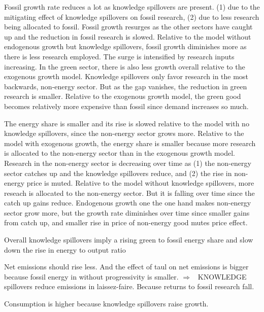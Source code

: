 \documentclass[12pt]{article}
\newcommand{\ar}{$\Rightarrow$ \ }
\begin{document}
Fossil growth rate reduces a lot as knowledge spillovers are present. (1) due to the mitigating effect of knowledge spillovers on fossil research, (2) due to less research being allocated to fossil. Fossil growth resurges as the other sectors have caught up and the reduction in fossil research is slowed. Relative to the model without endogenous growth but knowledge spillovers, fossil growth diminishes more as there is less research employed. The surge is intensified by research inputs increasing. 
In the green sector, there is also less growth overall relative to the exogenous growth model. Knowledge spillovers only favor research in the most backwards, non-energy sector. But as the gap vanishes, the reduction in green research is smaller. Relative to the exogenous growth model, the green good becomes relatively more expensive than fossil since demand increases so much. 


The energy share is smaller and its rise is slowed relative to the model with no knowledge spillovers, since the non-energy sector grows more. Relative to the model with exogenous growth, the energy share is smaller because more research is allocated to the non-energy sector than in the exogenous growth model. Research in the non-energy sector is decreasing over time as (1) the non-energy sector catches up and the knowledge spillovers reduce, and (2) the rise in non-energy price is muted. Relative to the model without knowledge spillovers, more reseach is allocated to the non-energy sector. But it is falling over time since the catch up gains reduce. 
Endogenous growth one the one hand makes non-energy sector grow more, but the growth rate diminishes over time since smaller gains from catch up, and smaller rise in price of non-energy good mutes price effect. 


Overall  knowledge spillovers imply a rising green to fossil energy share and slow down the rise in energy to output ratio


Net emissions should rise less. And the effect of taul on net emissions is bigger because fossil energy in without progressivity is smaller. \ar KNOWLEDGE spillovers reduce emissions in laissez-faire. Because returns to fossil research fall. 

Consumption is higher because knowledge spillovers raise growth. 
\end{document}
